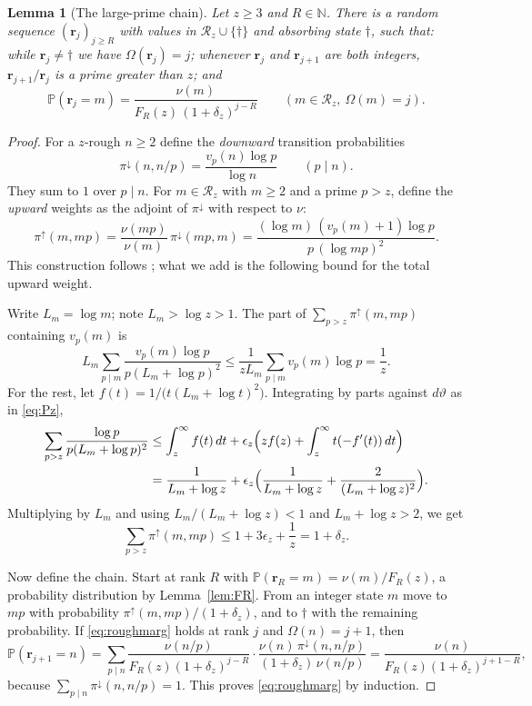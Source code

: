 \documentclass[11pt,a4paper]{article}
\numberwithin{equation}{section}
\theoremstyle{plain}
\newtheorem{lemma}[theorem]{Lemma}
\theoremstyle{definition}
\theoremstyle{remark}
\newcommand{\N}{\mathbb{N}}
\newcommand{\PP}{\mathbb{P}}
\newcommand{\cR}{\mathcal{R}}
\newcommand{\br}{\mathbf{r}}
\newcommand{\dn}{\pi^{\downarrow}}
\newcommand{\up}{\pi^{\uparrow}}
\begin{document}
\begin{lemma}[The large-prime chain]\label{lem:roughchain}
Let $z\ge3$ and $R\in\N$. There is a random sequence $(\br_j)_{j\ge R}$ with values in $\cR_z\cup\{\dagger\}$ and absorbing state $\dagger$, such that: while $\br_j\ne\dagger$ we have $\Omega(\br_j)=j$; whenever $\br_j$ and $\br_{j+1}$ are both integers, $\br_{j+1}/\br_j$ is a prime greater than $z$; and
\begin{equation}\label{eq:roughmarg}
\PP(\br_j=m)=\frac{\nu(m)}{F_R(z)\,(1+\delta_z)^{j-R}}\qquad(m\in\cR_z,\ \Omega(m)=j).
\end{equation}
\end{lemma}

\begin{proof}
For a $z$-rough $n\ge2$ define the \emph{downward} transition probabilities
\[
\dn(n,n/p)=\frac{v_p(n)\log p}{\log n}\qquad(p\mid n).
\]
They sum to $1$ over $p\mid n$. For $m\in\cR_z$ with $m\ge2$ and a prime $p>z$, define the \emph{upward} weights as the adjoint of $\dn$ with respect to $\nu$:
\[
\up(m,mp)=\frac{\nu(mp)}{\nu(m)}\,\dn(mp,m)=\frac{(\log m)\,(v_p(m)+1)\log p}{p\,(\log mp)^2}.
\]
This construction follows \cite[Section~2.2]{ABLLPSTT}; what we add is the following bound for the total upward weight.

Write $L_m=\log m$; note $L_m>\log z>1$. The part of $\sum_{p>z}\up(m,mp)$ containing $v_p(m)$ is
\[
L_m\sum_{p\mid m}\frac{v_p(m)\log p}{p(L_m+\log p)^2}\le\frac{1}{zL_m}\sum_{p\mid m}v_p(m)\log p=\frac1z .
\]
For the rest, let $f(t)=1/\bigl(t(L_m+\log t)^2\bigr)$. Integrating by parts against $d\vartheta$ as in \eqref{eq:Pz},
\[
\begin{aligned}
\sum_{p>z}\frac{\log p}{p(L_m+\log p)^2}&\le\int_z^\infty f(t)\,dt+\epsilon_z\Bigl(zf(z)+\int_z^\infty t(-f'(t))\,dt\Bigr)\\
&=\frac{1}{L_m+\log z}+\epsilon_z\Bigl(\frac{1}{L_m+\log z}+\frac{2}{(L_m+\log z)^2}\Bigr).
\end{aligned}
\]
Multiplying by $L_m$ and using $L_m/(L_m+\log z)<1$ and $L_m+\log z>2$, we get
\[
\sum_{p>z}\up(m,mp)\le1+3\epsilon_z+\frac1z=1+\delta_z .
\]

Now define the chain. Start at rank $R$ with $\PP(\br_R=m)=\nu(m)/F_R(z)$, a probability distribution by Lemma~\ref{lem:FR}. From an integer state $m$ move to $mp$ with probability $\up(m,mp)/(1+\delta_z)$, and to $\dagger$ with the remaining probability. If \eqref{eq:roughmarg} holds at rank $j$ and $\Omega(n)=j+1$, then
\[
\PP(\br_{j+1}=n)=\sum_{p\mid n}\frac{\nu(n/p)}{F_R(z)(1+\delta_z)^{j-R}}\cdot\frac{\nu(n)\,\dn(n,n/p)}{(1+\delta_z)\,\nu(n/p)}=\frac{\nu(n)}{F_R(z)(1+\delta_z)^{j+1-R}},
\]
because $\sum_{p\mid n}\dn(n,n/p)=1$. This proves \eqref{eq:roughmarg} by induction.
\end{proof}
\end{document}
